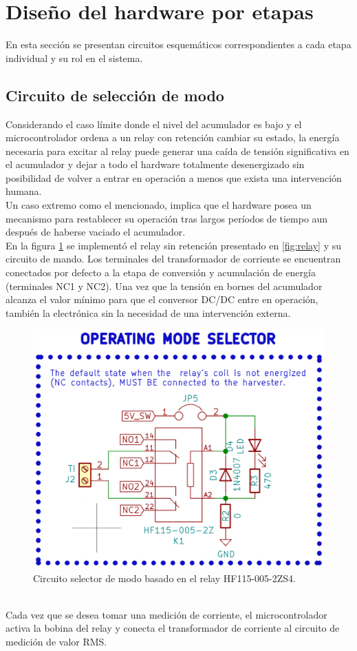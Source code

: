 \section{Diseño del hardware por etapas}
En esta sección se presentan circuitos esquemáticos correspondientes a cada etapa individual y su rol en el sistema.
\subsection{Circuito de selección de modo}
Considerando el caso límite donde el nivel del acumulador es bajo y el microcontrolador ordena a un relay con retención cambiar su estado, la energía necesaria para excitar al relay puede generar una caída de tensión significativa en el acumulador y dejar a todo el hardware totalmente desenergizado sin posibilidad de volver a entrar en operación a menos que exista una intervención humana.\\
Un caso extremo como el mencionado, implica que el hardware posea un mecanismo para restablecer su operación tras largos per\'{i}odos de tiempo aun después de haberse vaciado el acumulador.\\
En la figura \ref{fig:ctoselecciondemodo} se implementó el relay sin retención presentado en \ref{fig:relay} y su circuito de mando. Los terminales del transformador de corriente se encuentran conectados por defecto a la etapa de conversión y acumulación de energía (terminales NC1 y NC2). Una vez que la tensión en bornes del acumulador alcanza el valor mínimo para que el conversor DC/DC entre en operación, también la electrónica sin la necesidad de una intervención externa.\\
\begin{figure}[h]
	\centering
	\includegraphics[width=0.8\linewidth]{Figures/cto_seleccion_de_modo}
	\caption{Circuito selector de modo basado en el relay HF115-005-2ZS4.}
	\label{fig:ctoselecciondemodo}
\end{figure}\\
Cada vez que se desea tomar una medición de corriente, el microcontrolador activa la bobina del relay y conecta el transformador de corriente al circuito de medición de valor RMS.\\

